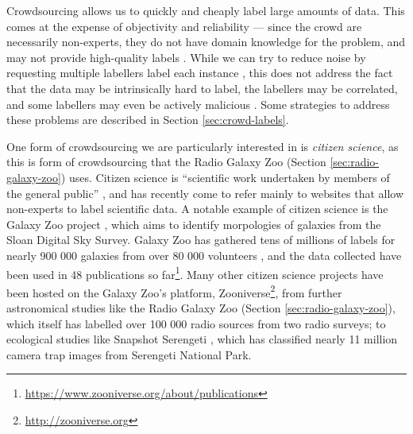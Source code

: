     Crowdsourcing allows us to quickly and cheaply label large amounts of data.
    This comes at the expense of objectivity and reliability --- since the crowd
    are necessarily non-experts, they do not have domain knowledge for the
    problem, and may not provide high-quality labels \citep{raykar10}. While we can try to reduce noise by requesting multiple labellers label each instance \citep{lin16, sheng08}, this does not address the fact that the data may be intrinsically hard to label, the labellers may be correlated, and some labellers may even be actively malicious \citep{yan10}. Some strategies to address these problems are described in Section \ref{sec:crowd-labels}.


    One form of crowdsourcing we are particularly interested in is
    \emph{citizen science}, as this is form of crowdsourcing that the Radio
    Galaxy Zoo (Section \ref{sec:radio-galaxy-zoo}) uses. Citizen science is
    ``scientific work undertaken by members of the general public'' \citep{oed-
    citizenscience, marshall15}, and has recently come to refer mainly to
    websites that allow non-experts to label scientific data. A notable example
    of citizen science is the Galaxy Zoo project \citep{lintott08}, which aims
    to identify morpologies of galaxies from the Sloan Digital Sky Survey.
    Galaxy Zoo has gathered tens of millions of labels for nearly 900 000
    galaxies from over 80 000 volunteers \citep{lintott11}, and the data
    collected have been used in 48 publications so
    far\footnote{\url{https://www.zooniverse.org/about/publications}}. Many
    other citizen science projects have been hosted on the Galaxy Zoo's
    platform, Zooniverse\footnote{\url{http://zooniverse.org}}, from further
    astronomical studies like the Radio Galaxy Zoo \citep{banfield15} (Section
    \ref{sec:radio-galaxy-zoo}), which itself has labelled over 100 000 radio
    sources from two radio surveys; to ecological studies like Snapshot
    Serengeti \citep{swanson15}, which has classified nearly 11 million camera
    trap images from Serengeti National Park.


